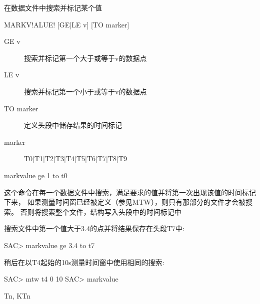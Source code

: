 \label{cmd:markvalue}

在数据文件中搜索并标记某个值

\begin{SACSTX}
MARKV!ALUE! [GE|LE v] [TO marker]
\end{SACSTX}

\begin{description}
\item [GE v] 搜索并标记第一个大于或等于v的数据点 
\item [LE v] 搜索并标记第一个小于或等于v的数据点 
\item [TO marker] 定义头段中储存结果的时间标记 
\item [marker] T0|T1|T2|T3|T4|T5|T6|T7|T8|T9 
\end{description}

\begin{SACDFT}
markvalue ge 1 to t0
\end{SACDFT}

这个命令在每一个数据文件中搜索，满足要求的值并将第一次出现该值的时间标记下来，
如果测量时间窗已经被定义（参见MTW），则只有那部分的文件才会被搜索。
否则将搜索整个文件，结构写入头段中的时间标记中

搜索文件中第一个值大于3.4的点并将结果保存在头段T7中:
\begin{SACCode}
SAC> markvalue ge 3.4 to t7
\end{SACCode}

稍后在以T4起始的10s测量时间窗中使用相同的搜索:
\begin{SACCode}
SAC> mtw t4 0 10
SAC> markvalue
\end{SACCode}

Tn, KTn

